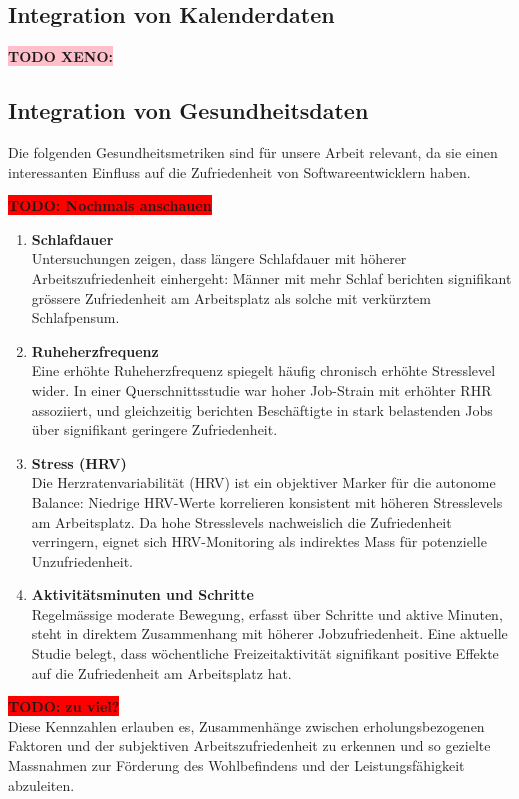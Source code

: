 \documentclass[12pt,a4paper]{report}
\newcommand{\todo}[1]{\colorbox{red}{\textbf{TODO: #1}}\\}
\newcommand{\xeno}[1]{\colorbox{pink}{\textbf{TODO XENO: #1}}\\}
\begin{document}
\subsection{Integration von Kalenderdaten}
\xeno{}
\subsection{Integration von Gesundheitsdaten}

Die folgenden Gesundheitsmetriken sind für unsere Arbeit relevant, da sie einen interessanten Einfluss
auf die Zufriedenheit von Softwareentwicklern haben.

\todo{Nochmals anschauen}
\begin{enumerate}
	\item \textbf{Schlafdauer}\\
	      Untersuchungen zeigen, dass längere Schlafdauer mit höherer Arbeitszufriedenheit einhergeht:
	      Männer mit mehr Schlaf berichten signifikant grössere Zufriedenheit am Arbeitsplatz als
	      solche mit verkürztem Schlafpensum.

	\item \textbf{Ruheherzfrequenz}\\
	      Eine erhöhte Ruheherzfrequenz spiegelt häufig chronisch erhöhte Stresslevel wider. In einer
	      Querschnittsstudie war hoher Job-Strain mit erhöhter RHR assoziiert, und gleichzeitig berichten
	      Beschäftigte in stark belastenden Jobs über signifikant geringere Zufriedenheit.

	\item \textbf{Stress (HRV)}\\
	      Die Herzratenvariabilität (HRV) ist ein objektiver Marker für die autonome Balance: Niedrige
	      HRV-Werte korrelieren konsistent mit höheren Stresslevels am Arbeitsplatz. Da hohe Stresslevels
	      nachweislich die Zufriedenheit verringern, eignet sich HRV-Monitoring als indirektes Mass für
	      potenzielle Unzufriedenheit.

	\item \textbf{Aktivitätsminuten und Schritte}\\
	      Regelmässige moderate Bewegung, erfasst über Schritte und aktive Minuten, steht in direktem
	      Zusammenhang mit höherer Jobzufriedenheit. Eine aktuelle Studie belegt, dass wöchentliche
	      Freizeitaktivität signifikant positive Effekte auf die Zufriedenheit am Arbeitsplatz hat.
\end{enumerate}

\todo{zu viel?}
Diese Kennzahlen erlauben es, Zusammenhänge zwischen erholungsbezogenen Faktoren und der subjektiven
Arbeitszufriedenheit zu erkennen und so gezielte Massnahmen zur Förderung des Wohlbefindens und der
Leistungsfähigkeit abzuleiten.
\end{document}
